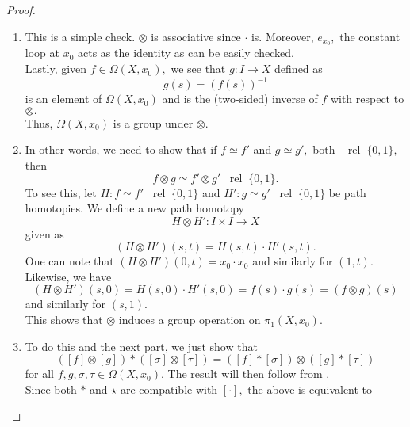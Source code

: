 \documentclass[12pt]{article}
\theoremstyle{definition}
\numberwithin{thm}{section}
\newcommand{\rel}{\;\;\operatorname{rel}\;}
\begin{document}
\begin{proof} 
	\phantom{Hi}
	\begin{enumerate}
		\item This is a simple check. $\otimes$ is associative since $\cdot$ is. Moreover, $e_{x_0},$ the constant loop at $x_0$ acts as the identity as can be easily checked.\\
		Lastly, given $f\in\Omega(X, x_0),$ we see that $g:I\to X$ defined as
		\begin{equation*} 
			g(s) = (f(s))^{-1}
		\end{equation*}
		is an element of $\Omega(X, x_0)$ and is the (two-sided) inverse of $f$ with respect to $\otimes.$\\
		Thus, $\Omega(X, x_0)$ is a group under $\otimes.$
		\item In other words, we need to show that if $f \simeq f'$ and $g \simeq g',$ both $\rel \{0, 1\},$ then
		\begin{equation*} 
			f\otimes g \simeq f'\otimes g' \rel\{0, 1\}.
		\end{equation*}
		To see this, let $H:f\simeq f' \rel\{0, 1\}$ and $H':g\simeq g'\rel\{0, 1\}$ be path homotopies. We define a new path homotopy 
		\begin{equation*} 
			H\otimes H': I \times I \to X
		\end{equation*} given as
		\begin{equation*} 
			(H \otimes H')(s, t) = H(s, t)\cdot H'(s, t).
		\end{equation*}
		One can note that $(H\otimes H')(0, t) = x_0\cdot x_0$ and similarly for $(1, t).$\\
		Likewise, we have 
		\begin{equation*} 
			(H \otimes H')(s, 0) = H(s, 0)\cdot H'(s, 0) = f(s)\cdot g(s) = (f\otimes g)(s)
		\end{equation*}
		and similarly for $(s, 1).$\\
		This shows that $\otimes$ induces a group operation on $\pi_1(X, x_0).$ 
		\item To do this and the next part, we just show that
		\begin{equation*} 
			([f] \otimes [g]) * ([\sigma] \otimes [\tau]) = ([f] * [\sigma]) \otimes ([g] * [\tau])
		\end{equation*}
		for all $f, g, \sigma, \tau \in \Omega(X, x_0).$ The result will then follow from .\\
		Since both $*$ and $\star$ are compatible with $[\cdot],$ the above is equivalent to

\end{enumerate}
\end{proof}
\end{document}
